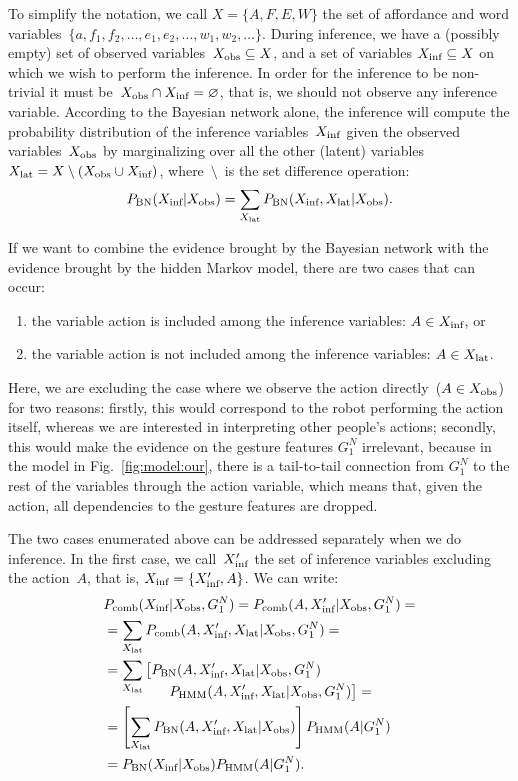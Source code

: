 To simplify the notation, we call $X = \{A, F, E, W\}$ the set of affordance and word variables~$\{a, f_1, f_2, \dots, e_1, e_2, \dots, w_1, w_2, \dots\}$.
During inference, we have a (possibly empty) set of observed variables~$X_\text{obs} \subseteq X$, and a set of variables $X_\text{inf} \subseteq X$ on which we wish to perform the inference.
In order for the inference to be non-trivial it must be~$X_\text{obs} \cap X_\text{inf} = \varnothing$, that is, we should not observe any inference variable.
According to the Bayesian network alone, the inference will compute the probability distribution of the inference variables~$X_\text{inf}$ given the observed variables~$X_\text{obs}$ by marginalizing over all the other (latent) variables $X_\text{lat} = X \setminus (X_\text{obs} \cup X_\text{inf})$, where~$\setminus$~is the set difference operation:
\begin{eqnarray*}
 P_{\text{BN}}(X_\text{inf}|X_\text{obs}) = \sum_{X_\text{lat}} P_{\text{BN}}(X_\text{inf}, X_\text{lat}| X_\text{obs}).
\end{eqnarray*}

If we want to combine the evidence brought by the Bayesian network with the evidence brought by the hidden Markov model, there are two cases that can occur:
\begin{enumerate}
\item the variable action is included among the inference variables: $A \in X_\text{inf}$, or
\item the variable action is not included among the inference variables: $A \in X_\text{lat}$.
\end{enumerate}
Here, we are excluding the case where we observe the action directly~($A\in X_\text{obs}$) for two reasons: firstly, this would correspond to the robot performing the action itself, whereas we are interested in interpreting other people's actions;
secondly, this would make the evidence on the gesture features $G_1^N$ irrelevant, because in the model in Fig.~\ref{fig:model:our}, there is a tail-to-tail connection from $G_1^N$ to the rest of the variables through the action variable, which means that, given the action, all dependencies to the gesture features are dropped.

The two cases enumerated above can be addressed separately when we do inference.
In the first case, we call~$X_\text{inf}^\prime$ the set of inference variables excluding the action~$A$, that is, $X_\text{inf} = \{X_\text{inf}^\prime, A\}$.
We can write:
\begin{align*}
  & P_\text{comb}(X_\text{inf}| X_\text{obs}, G_1^N) = P_\text{comb}(A, X_\text{inf}^\prime| X_\text{obs}, G_1^N)= \\
  &= \sum_{X_\text{lat}} P_\text{comb}(A, X_\text{inf}^\prime, X_\text{lat}| X_\text{obs}, G_1^N)=\\
  &= \sum_{X_\text{lat}} \left[P_{\text{BN}}(A, X_\text{inf}^\prime, X_\text{lat}| X_\text{obs}, G_1^N)\right. \\[-4mm]
    & \mspace{80mu} \left.P_{\text{HMM}}(A, X_\text{inf}^\prime, X_\text{lat}| X_\text{obs}, G_1^N)\right]= \\
  &= \left[\sum_{X_\text{lat}} P_{\text{BN}}(A, X_\text{inf}^\prime, X_\text{lat}| X_\text{obs})\right] P_{\text{HMM}}(A | G_1^N) \\
  &= P_{\text{BN}}(X_\text{inf}| X_\text{obs}) P_{\text{HMM}}(A | G_1^N).
\end{align*}

